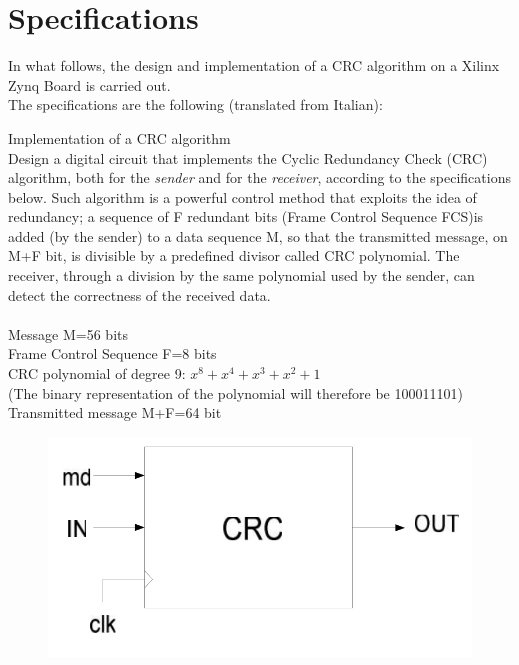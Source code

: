 %
\chapter*{Specifications}
In what follows, the design and implementation of a CRC algorithm on a Xilinx Zynq Board is carried out.\\
The specifications are the following (translated from Italian):
\hfill \break
\begin{displayquote}
    \begin{specifications}
    {\Large Implementation of a CRC algorithm}\\
		Design a digital circuit that implements the Cyclic Redundancy Check (CRC) algorithm, both for the \textit{sender} and for the \textit{receiver}, according to the specifications below.
		Such algorithm is a powerful control method that exploits the idea of redundancy; a sequence of F redundant bits (Frame Control Sequence FCS)is added (by the sender) to a data sequence M, so that the transmitted message, on M+F bit, is divisible by a predefined divisor called CRC polynomial. The receiver, through a division by the same polynomial used by the sender, can detect the correctness of the received data.\\
\\
	Message M=56 bits\\
	Frame Control Sequence F=8 bits\\
	CRC polynomial of degree 9: $x^{8} + x^{4} + x^3 + x^{2} + 1$\\
	(The binary representation of the polynomial will therefore be 100011101)\\
	Transmitted message M+F=64 bit
	
		
		
		\begin{figure}[H]
		    \begin{center}
	        \includegraphics[scale=0.5]{img/high_lvl_schematics.png}


\end{center}
\end{figure}
\end{specifications}
\end{displayquote}
